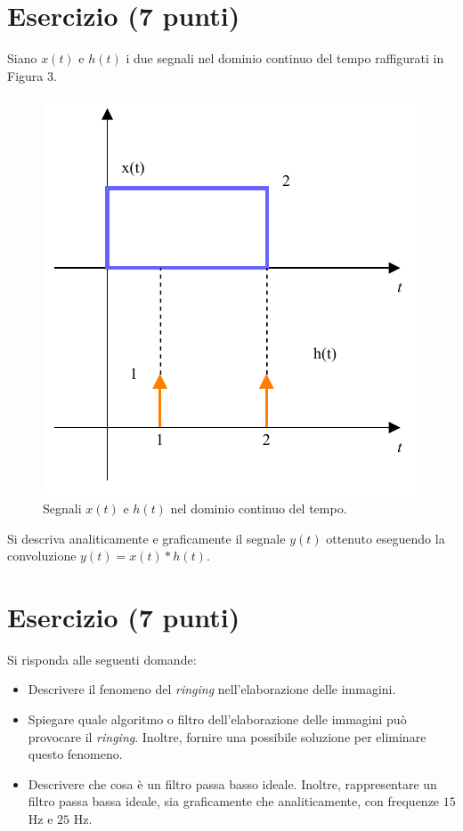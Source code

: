 \documentclass[a4paper]{article}
\begin{document}
	\section{Esercizio (7 punti)}
	
	Siano $x\left(t\right)$ e $h\left(t\right)$ i due segnali nel dominio continuo del tempo raffigurati in Figura 3.
	
	\begin{figure}[!htp]
		\centering
		\includegraphics[width=.7\textwidth]{img/fig_3.pdf}
		\caption{Segnali $x\left(t\right)$ e $h\left(t\right)$ nel dominio continuo del tempo.}
	\end{figure}

	\noindent
	Si descriva analiticamente e graficamente il segnale $y\left(t\right)$ ottenuto eseguendo la convoluzione $y\left(t\right) = x\left(t\right) * h\left(t\right)$.
	
	\section{Esercizio (7 punti)}
	
	Si risponda alle seguenti domande:
	\begin{itemize}
		\item Descrivere il fenomeno del \emph{ringing} nell'elaborazione delle immagini. 
		
		\item Spiegare quale algoritmo o filtro dell'elaborazione delle immagini può provocare il \emph{ringing}. Inoltre, fornire una possibile soluzione per eliminare questo fenomeno.
		
		\item Descrivere che cosa è un filtro passa basso ideale. Inoltre, rappresentare un filtro passa bassa ideale, sia graficamente che analiticamente, con frequenze $15$ Hz e $25$ Hz.
	\end{itemize}\newpage
	
\end{document}
